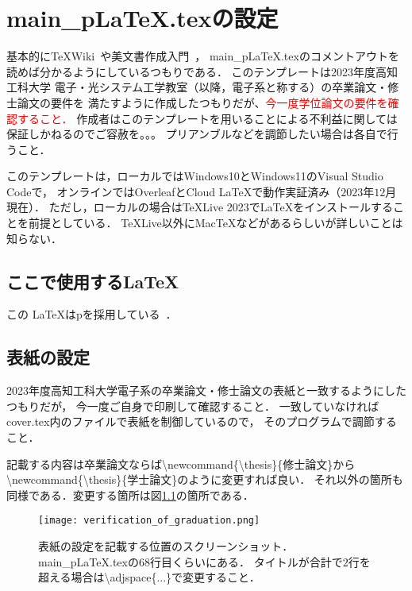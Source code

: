 \chapter{main\_pLaTeX.texの設定}
基本的に\TeX Wiki~\cite{platex}や美文書作成入門~\cite{美文書作成入門}，
main\_pLaTeX.texのコメントアウトを読めば分かるようにしているつもりである．
このテンプレートは2023年度高知工科大学 電子・光システム工学教室（以降，電子系と称する）の卒業論文・修士論文の要件を
満たすように作成したつもりだが、\textcolor{red}{今一度学位論文の要件を確認すること．}
作成者はこのテンプレートを用いることによる不利益に関しては保証しかねるのでご容赦を。。。
プリアンブルなどを調節したい場合は各自で行うこと．

このテンプレートは，ローカルではWindows10とWindows11のVisual Studio Codeで，
オンラインではOverleafとCloud LaTeXで動作実証済み（$2023$年$12$月現在）．
ただし，ローカルの場合は\TeX Live 2023で\LaTeX をインストールすることを前提としている．
\TeX Live以外にMac\TeX などがあるらしいが詳しいことは知らない．

\section{ここで使用する\LaTeX}
この \LaTeX はp\LaTeXe を採用している~\cite{美文書作成入門}．

\section{表紙の設定}
2023年度高知工科大学電子系の卒業論文・修士論文の表紙と一致するようにしたつもりだが，
今一度ご自身で印刷して確認すること．
一致していなければcover.tex内のファイルで表紙を制御しているので，
そのプログラムで調節すること．

記載する内容は卒業論文ならば\textbackslash newcommand\{\textbackslash thesis\}\{修士論文\}から
\textbackslash newcommand\{\textbackslash thesis\}\{学士論文\}のように変更すれば良い．
それ以外の箇所も同様である．変更する箇所は図\ref{fig:cover}の箇所である．

\begin{figure}[h]
  \centering
  \texttt{[image: verification\_of\_graduation.png]}
  \caption{
    表紙の設定を記載する位置のスクリーンショット．main\_pLaTeX.texの$68$行目くらいにある．
    タイトルが合計で$2$行を超える場合は\textbackslash adjspace\{...\}で変更すること．}
  \label{fig:cover}
\end{figure}

